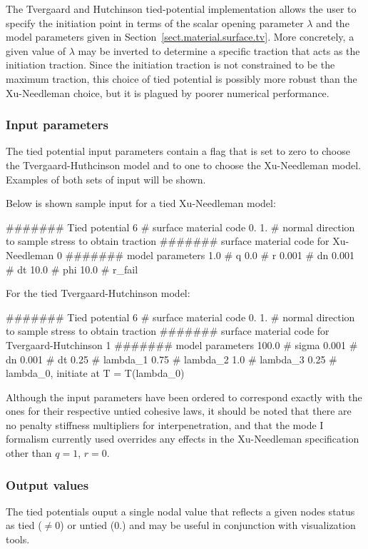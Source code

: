 The Tvergaard and Hutchinson tied-potential implementation allows
the user to specify the initiation point in terms of the scalar 
opening parameter $\lambda$ and the model parameters given in
Section~\ref{sect.material.surface.tv}. More concretely, a given
value of $\lambda$ may be inverted to determine a specific traction
that acts as the initiation traction. Since the initiation traction is
not constrained to be the maximum traction, this choice of tied potential
is possibly more robust than the Xu-Needleman choice, but it is 
plagued by poorer numerical performance. 

\subsubsection{Input parameters}
The tied potential input parameters contain a flag that is set to
zero to choose the Tvergaard-Huthcinson model and to one to choose
the Xu-Needleman model. Examples of both sets of input will be shown.

Below is shown sample input for a tied Xu-Needleman model:
\begin{inputfile}
####### Tied potential
6     # surface material code
0. 1. # normal direction to sample stress to obtain traction
####### surface material code for Xu-Needleman
0
####### model parameters
1.0   # q
0.0   # r 
0.001 # dn
0.001 # dt
10.0  # phi
10.0  # r_fail
\end{inputfile}

For the tied Tvergaard-Hutchinson model:
\begin{inputfile}
####### Tied potential
6     # surface material code
0. 1. # normal direction to sample stress to obtain traction
####### surface material code for Tvergaard-Hutchinson
1
####### model parameters
100.0 # sigma
0.001 # dn
0.001 # dt
0.25  # lambda_1
0.75  # lambda_2
1.0   # lambda_3
0.25  # lambda_0, initiate at T = T(lambda_0)
\end{inputfile}

Although the input parameters have been ordered to correspond exactly
with the ones for their respective untied cohesive laws, it should be
noted that there are no penalty stiffness multipliers for interpenetration,
and that the mode I formalism currently used overrides any effects in
the Xu-Needleman specification other than $q = 1$, $r = 0$. 


\subsubsection{Output values}
The tied potentials ouput a single nodal value that reflects a given
nodes status as tied ($\neq 0$) or untied ($0.$) and may be useful 
in conjunction with visualization tools. 

